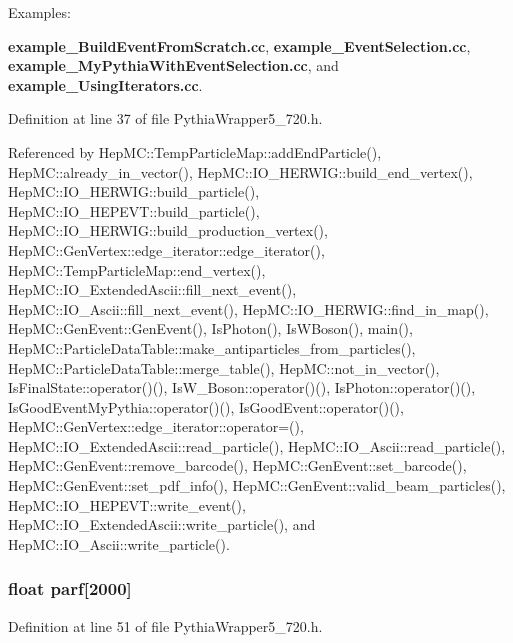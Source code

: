 \begin{Desc}
\item[Examples: ]\par
{\bf example\_\-Build\-Event\-From\-Scratch.cc}, {\bf example\_\-Event\-Selection.cc}, {\bf example\_\-My\-Pythia\-With\-Event\-Selection.cc}, and {\bf example\_\-Using\-Iterators.cc}.\end{Desc}


Definition at line 37 of file Pythia\-Wrapper5\_\-720.h.

Referenced by Hep\-MC::Temp\-Particle\-Map::add\-End\-Particle(), Hep\-MC::already\_\-in\_\-vector(), Hep\-MC::IO\_\-HERWIG::build\_\-end\_\-vertex(), Hep\-MC::IO\_\-HERWIG::build\_\-particle(), Hep\-MC::IO\_\-HEPEVT::build\_\-particle(), Hep\-MC::IO\_\-HERWIG::build\_\-production\_\-vertex(), Hep\-MC::Gen\-Vertex::edge\_\-iterator::edge\_\-iterator(), Hep\-MC::Temp\-Particle\-Map::end\_\-vertex(), Hep\-MC::IO\_\-Extended\-Ascii::fill\_\-next\_\-event(), Hep\-MC::IO\_\-Ascii::fill\_\-next\_\-event(), Hep\-MC::IO\_\-HERWIG::find\_\-in\_\-map(), Hep\-MC::Gen\-Event::Gen\-Event(), Is\-Photon(), Is\-WBoson(), main(), Hep\-MC::Particle\-Data\-Table::make\_\-antiparticles\_\-from\_\-particles(), Hep\-MC::Particle\-Data\-Table::merge\_\-table(), Hep\-MC::not\_\-in\_\-vector(), Is\-Final\-State::operator()(), Is\-W\_\-Boson::operator()(), Is\-Photon::operator()(), Is\-Good\-Event\-My\-Pythia::operator()(), Is\-Good\-Event::operator()(), Hep\-MC::Gen\-Vertex::edge\_\-iterator::operator=(), Hep\-MC::IO\_\-Extended\-Ascii::read\_\-particle(), Hep\-MC::IO\_\-Ascii::read\_\-particle(), Hep\-MC::Gen\-Event::remove\_\-barcode(), Hep\-MC::Gen\-Event::set\_\-barcode(), Hep\-MC::Gen\-Event::set\_\-pdf\_\-info(), Hep\-MC::Gen\-Event::valid\_\-beam\_\-particles(), Hep\-MC::IO\_\-HEPEVT::write\_\-event(), Hep\-MC::IO\_\-Extended\-Ascii::write\_\-particle(), and Hep\-MC::IO\_\-Ascii::write\_\-particle().
\subsubsection{\setlength{\rightskip}{0pt plus 5cm}float {\bf parf}[2000]}\label{PythiaWrapper5__720_8h_f79c8980b6c7e51c6b3d15d6120ac4e1}




Definition at line 51 of file Pythia\-Wrapper5\_\-720.h.
